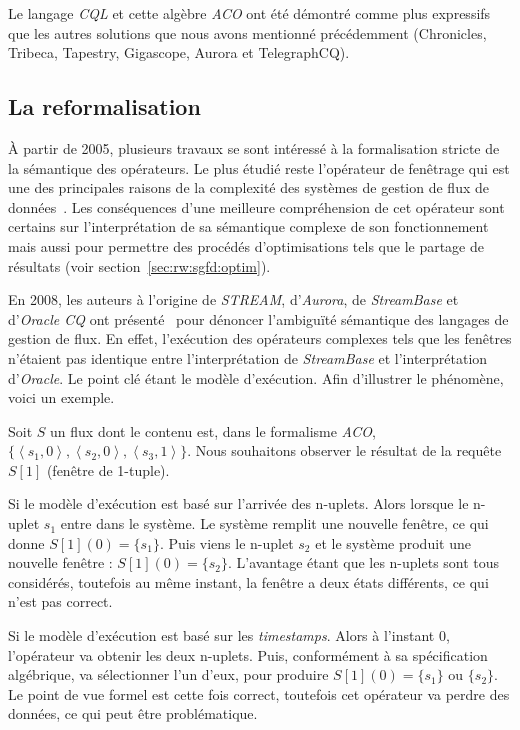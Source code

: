 Le langage \textit{CQL} et cette algèbre \textit{ACO} ont été démontré comme plus expressifs~\cite{Arasu:cql} que les autres solutions que nous avons mentionné précédemment (Chronicles, Tribeca, Tapestry, Gigascope, Aurora et TelegraphCQ).

\subsection{La reformalisation}\label{sec:rw:sgfd:modeles:batch}
À partir de 2005, plusieurs travaux se sont intéressé à la formalisation stricte de la sémantique des opérateurs. Le plus étudié reste l'opérateur de fenêtrage qui est une des principales raisons de la complexité des systèmes de gestion de flux de données~\cite{Maier:semantics,Patroumpas:window,Patroumpas:subsumewindows}. Les conséquences d'une meilleure compréhension de cet opérateur sont certains sur l'interprétation de sa sémantique complexe de son fonctionnement mais aussi pour permettre des procédés d'optimisations tels que le partage de résultats (voir section~\ref{sec:rw:sgfd:optim}).

En 2008, les auteurs à l'origine de \textit{STREAM}, d'\textit{Aurora}, de \textit{StreamBase} et d'\textit{Oracle CQ} ont présenté~\cite{Jain:spread} pour dénoncer l'ambiguïté sémantique des langages de gestion de flux. En effet, l'exécution des opérateurs complexes tels que les fenêtres n'étaient pas identique entre l'interprétation de \textit{StreamBase} et l'interprétation d'\textit{Oracle}. Le point clé étant le modèle d'exécution. Afin d'illustrer le phénomène, voici un exemple.

\begin{example}\label{ex:rw:sgfd:batches}
 Soit $S$ un flux dont le contenu est, dans le formalisme \textit{ACO}, $\{\left<s_1,0\right>, \left<s_2,0\right>, \left<s_3,1\right>\}$. Nous souhaitons observer le résultat de la requête $S[1]$ (fenêtre de 1-tuple).

Si le modèle d'exécution est basé sur l'arrivée des n-uplets. Alors lorsque le n-uplet $s_1$ entre dans le système. Le système remplit une nouvelle fenêtre, ce qui donne $S[1](0)=\{s_1\}$. Puis viens le n-uplet $s_2$ et le système produit une nouvelle fenêtre : $S[1](0)=\{s_2\}$. L'avantage étant que les n-uplets sont tous considérés, toutefois au même instant, la fenêtre a deux états différents, ce qui n'est pas correct.

Si le modèle d'exécution est basé sur les \textit{timestamps}. Alors à l'instant 0, l'opérateur va obtenir les deux n-uplets. Puis, conformément à sa spécification algébrique, va sélectionner l'un d'eux, pour produire $S[1](0) = \{s_1\}$ ou $\{s_2\}$. Le point de vue formel est cette fois correct, toutefois cet opérateur va perdre des données, ce qui peut être problématique.
\end{example}

